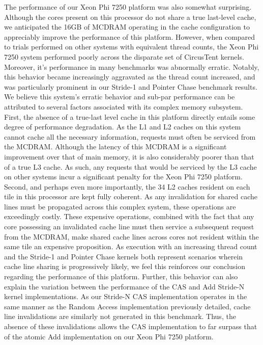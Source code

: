 The performance of our Xeon Phi 7250 platform was also somewhat surprising.
Although the cores present on this processor do not share a true last-level cache, we anticipated the 16GB of MCDRAM operating in the cache configuration to appreciably improve the performance of this platform.
However, when compared to trials performed on other systems with equivalent thread counts, the Xeon Phi 7250 system performed poorly across the disparate set of CircusTent kernels.
Moreover, it's performance in many benchmarks was abnormally erratic.
Notably, this behavior became increasingly aggravated as the thread count increased, and was particularly prominent in our Stride-1 and Pointer Chase benchmark results.
We believe this system's erratic behavior and sub-par performance can be attributed to several factors associated with its complex memory subsystem.
First, the absence of a true-last level cache in this platform directly entails some degree of performance degradation.
As the L1 and L2 caches on this system cannot cache all the necessary information, requests must often be serviced from the MCDRAM.
Although the latency of this MCDRAM is a significant improvement over that of main memory, it is also considerably poorer than that of a true L3 cache.
As such, any requests that would be serviced by the L3 cache on other systems incur a significant penalty for the Xeon Phi 7250 platform.
Second, and perhaps even more importantly, the 34 L2 caches resident on each tile in this processor are kept fully coherent.
As any invalidation for shared cache lines must be propagated across this complex system, these operations are exceedingly costly.
These expensive operations, combined with the fact that any core possessing an invalidated cache line must then service a subsequent request from the MCDRAM, make shared cache lines across cores not resident within the same tile an expensive proposition.
As execution with an increasing thread count and the Stride-1 and Pointer Chase kernels both represent scenarios wherein cache line sharing is progressively likely, we feel this reinforces our conclusion regarding the performance of this platform.
Further, this behavior can also explain the variation between the performance of the CAS and Add Stride-N kernel implementations.
As our Stride-N CAS implementation operates in the same manner as the Random Access implementation previously detailed, cache line invalidations are similarly not generated in this benchmark.
Thus, the absence of these invalidations allows the CAS implementation to far surpass that of the atomic Add implementation on our Xeon Phi 7250 platform.

